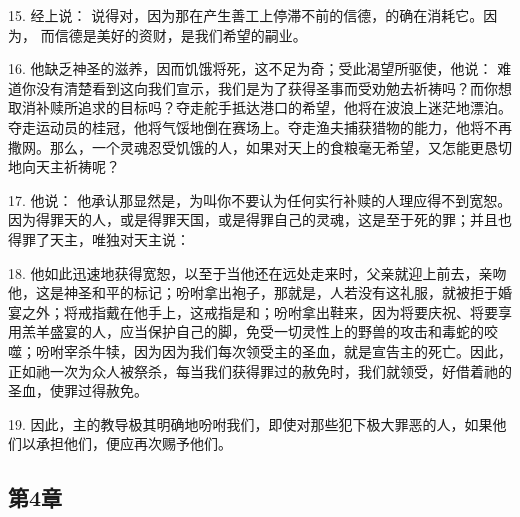 15. 经上说： 说得对，因为那在产生善工上停滞不前的信德，的确在消耗它。因为，  而信德是美好的资财，是我们希望的嗣业。\par

16. 他缺乏神圣的滋养，因而饥饿将死，这不足为奇；受此渴望所驱使，他说： 难道你没有清楚看到这向我们宣示，我们是为了获得圣事而受劝勉去祈祷吗？而你想取消补赎所追求的目标吗？夺走舵手抵达港口的希望，他将在波浪上迷茫地漂泊。夺走运动员的桂冠，他将气馁地倒在赛场上。夺走渔夫捕获猎物的能力，他将不再撒网。那么，一个灵魂忍受饥饿的人，如果对天上的食粮毫无希望，又怎能更恳切地向天主祈祷呢？\par

17. 他说： 他承认那显然是，为叫你不要认为任何实行补赎的人理应得不到宽恕。因为得罪天的人，或是得罪天国，或是得罪自己的灵魂，这是至于死的罪；并且也得罪了天主，唯独对天主说：\par

18. 他如此迅速地获得宽恕，以至于当他还在远处走来时，父亲就迎上前去，亲吻他，这是神圣和平的标记；吩咐拿出袍子，那就是，人若没有这礼服，就被拒于婚宴之外；将戒指戴在他手上，这戒指是和；吩咐拿出鞋来，因为将要庆祝、将要享用羔羊盛宴的人，应当保护自己的脚，免受一切灵性上的野兽的攻击和毒蛇的咬噬；吩咐宰杀牛犊，因为因为我们每次领受主的圣血，就是宣告主的死亡。因此，正如祂一次为众人被祭杀，每当我们获得罪过的赦免时，我们就领受，好借着祂的圣血，使罪过得赦免。\par

19. 因此，主的教导极其明确地吩咐我们，即使对那些犯下极大罪恶的人，如果他们以承担他们，便应再次赐予他们。\par


\subsection{第4章}

